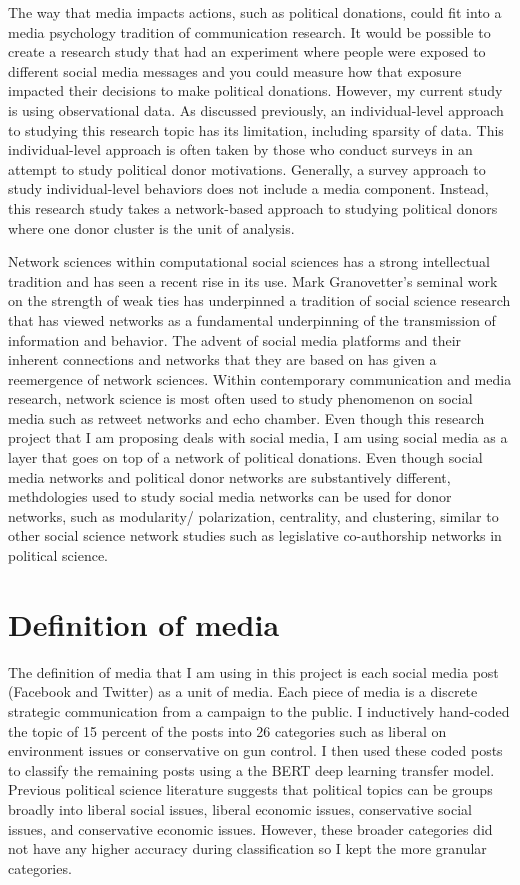 \documentclass[12pt,]{article}
\begin{document}
The way that media impacts actions, such as political donations, could
fit into a media psychology tradition of communication research. It
would be possible to create a research study that had an experiment
where people were exposed to different social media messages and you
could measure how that exposure impacted their decisions to make
political donations. However, my current study is using observational
data. As discussed previously, an individual-level approach to studying
this research topic has its limitation, including sparsity of data. This
individual-level approach is often taken by those who conduct surveys in
an attempt to study political donor motivations. Generally, a survey
approach to study individual-level behaviors does not include a media
component. Instead, this research study takes a network-based approach
to studying political donors where one donor cluster is the unit of
analysis.

Network sciences within computational social sciences has a strong
intellectual tradition and has seen a recent rise in its use. Mark
Granovetter's seminal work on the strength of weak ties has underpinned
a tradition of social science research that has viewed networks as a
fundamental underpinning of the transmission of information and
behavior. The advent of social media platforms and their inherent
connections and networks that they are based on has given a reemergence
of network sciences. Within contemporary communication and media
research, network science is most often used to study phenomenon on
social media such as retweet networks and echo chamber. Even though this
research project that I am proposing deals with social media, I am using
social media as a layer that goes on top of a network of political
donations. Even though social media networks and political donor
networks are substantively different, methdologies used to study social
media networks can be used for donor networks, such as modularity/
polarization, centrality, and clustering, similar to other social
science network studies such as legislative co-authorship networks in
political science.

\hypertarget{definition-of-media}{%
\section{Definition of media}\label{definition-of-media}}

The definition of media that I am using in this project is each social
media post (Facebook and Twitter) as a unit of media. Each piece of
media is a discrete strategic communication from a campaign to the
public. I inductively hand-coded the topic of 15 percent of the posts
into 26 categories such as liberal on environment issues or conservative
on gun control. I then used these coded posts to classify the remaining
posts using a the BERT deep learning transfer model. Previous political
science literature suggests that political topics can be groups broadly
into liberal social issues, liberal economic issues, conservative social
issues, and conservative economic issues. However, these broader
categories did not have any higher accuracy during classification so I
kept the more granular categories.
\end{document}
